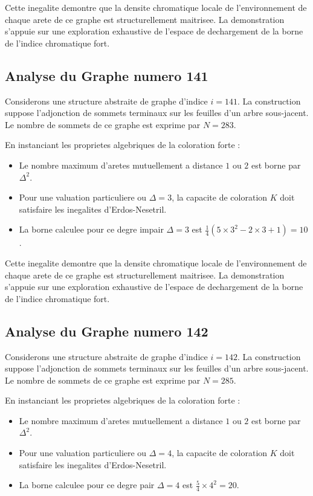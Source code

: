 \documentclass[11pt,a4paper]{article}
\begin{document}
Cette inegalite demontre que la densite chromatique locale de l'environnement de chaque arete de ce graphe est structurellement maitrisee. La demonstration s'appuie sur une exploration exhaustive de l'espace de dechargement de la borne de l'indice chromatique fort.

\subsection{Analyse du Graphe numero 141}
Considerons une structure abstraite de graphe d'indice $i = 141$. La construction suppose l'adjonction de sommets terminaux sur les feuilles d'un arbre sous-jacent. Le nombre de sommets de ce graphe est exprime par $N = 283$.

En instanciant les proprietes algebriques de la coloration forte :
\begin{itemize}
\item Le nombre maximum d'aretes mutuellement a distance $1$ ou $2$ est borne par $\Delta^2$.
\item Pour une valuation particuliere ou $\Delta = 3$, la capacite de coloration $K$ doit satisfaire les inegalites d'Erdos-Nesetril.
\item La borne calculee pour ce degre impair $\Delta = 3$ est $\frac{1}{4}(5 \times 3^2 - 2 \times 3 + 1) = 10$.
\end{itemize}

Cette inegalite demontre que la densite chromatique locale de l'environnement de chaque arete de ce graphe est structurellement maitrisee. La demonstration s'appuie sur une exploration exhaustive de l'espace de dechargement de la borne de l'indice chromatique fort.

\subsection{Analyse du Graphe numero 142}
Considerons une structure abstraite de graphe d'indice $i = 142$. La construction suppose l'adjonction de sommets terminaux sur les feuilles d'un arbre sous-jacent. Le nombre de sommets de ce graphe est exprime par $N = 285$.

En instanciant les proprietes algebriques de la coloration forte :
\begin{itemize}
\item Le nombre maximum d'aretes mutuellement a distance $1$ ou $2$ est borne par $\Delta^2$.
\item Pour une valuation particuliere ou $\Delta = 4$, la capacite de coloration $K$ doit satisfaire les inegalites d'Erdos-Nesetril.
\item La borne calculee pour ce degre pair $\Delta = 4$ est $\frac{5}{4} \times 4^2 = 20$.
\end{itemize}
\end{document}
